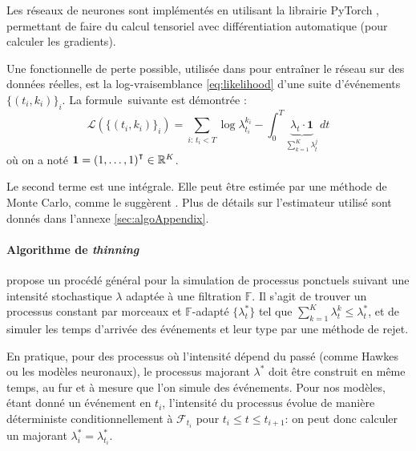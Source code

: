 \documentclass[../main.tex]{subfiles}
\begin{document}
	
Les réseaux de neurones sont implémentés en utilisant la librairie \textsf{PyTorch} \cite{paszke2017automatic}, permettant de faire du calcul tensoriel avec différentiation automatique (pour calculer les gradients).

Une fonctionnelle de perte possible, utilisée dans \autocite{meiEisnerNeuralHawkes} pour entraîner le réseau sur des données réelles, est la log-vraisemblance \eqref{eq:likelihood} d'une suite d'événements $\{(t_i,k_i)\}_i$. La formule\footnotemark~suivante est démontrée \cite[15]{meiEisnerNeuralHawkes}: 
\begin{equation}\label{eq:explicitLikelihood}
\mathcal{L}\left(\{(t_i,k_i)\}_i\right)
=
\sum_{i:\, t_i < T} \log\lambda^{k_i}_{t_i} - \int_0^T \underbrace{\lambda_t\cdot\mathbf{1}}_{\sum_{k=1}^K\lambda^j_t}\,dt
\end{equation}
où on a noté $\mathbf{1} = {(1,\ldots,1)}^\intercal\in\mathbb{R}^K$.


Le second terme est une intégrale. Elle peut être estimée par une méthode de Monte Carlo, comme le suggèrent \citeauthor{meiEisnerNeuralHawkes}. Plus de détails sur l'estimateur utilisé sont donnés dans l'annexe \autoref{sec:algoAppendix}.

\paragraph{Algorithme de \textit{thinning}} \citeauthor{ogata1981} propose un procédé général pour la simulation de processus ponctuels suivant une intensité stochastique $\lambda$ adaptée à une filtration $\mathds{F}$. Il s'agit de trouver un processus constant par morceaux et $\mathds{F}$-adapté $\{\lambda_t^*\}$ tel que $\sum_{k=1}^{K}\lambda^k_t \leq \lambda_t^*$, et de simuler les temps d'arrivée des événements et leur type par une méthode de rejet. \autocite{ogata1981}

En pratique, pour des processus où l'intensité dépend du passé (comme Hawkes ou les modèles neuronaux), le processus majorant $\lambda^*$ doit être construit en même temps, au fur et à mesure que l'on simule des événements. Pour nos modèles, étant donné un événement en $t_i$, l'intensité du processus évolue de manière déterministe conditionnellement à $\mathcal{F}_{t_i}$ pour $t_i\leq t\leq t_{i+1}$: on peut donc calculer un majorant $\lambda_i^* = \lambda^*_{t_i}$.
\end{document}
